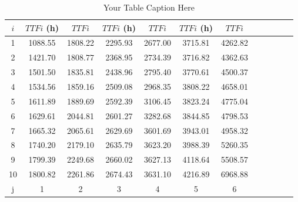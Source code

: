 \documentclass{article}
\begin{document}
\begin{table}[H]
    \centering
    \begin{tabular}{|*{12}{c|}}
        \hline
        $i$ & $TTFi$ (h) & $TTFi$ & $TTFi$ (h) & $TTFi$ & $TTFi$ (h) & $TTFi$ \\
        \hline
        1 & 1088.55 & 1808.22 & 2295.93 & 2677.00 & 3715.81 & 4262.82 \\
        2 & 1421.70 & 1808.77 & 2368.95 & 2734.39 & 3716.82 & 4362.63 \\
        3 & 1501.50 & 1835.81 & 2438.96 & 2795.40 & 3770.61 & 4500.37 \\
        4 & 1534.56 & 1859.16 & 2509.08 & 2968.35 & 3808.22 & 4658.01 \\
        5 & 1611.89 & 1889.69 & 2592.39 & 3106.45 & 3823.24 & 4775.04 \\
        6 & 1629.61 & 2044.81 & 2601.27 & 3282.68 & 3844.85 & 4798.53 \\
        7 & 1665.32 & 2065.61 & 2629.69 & 3601.69 & 3943.01 & 4958.32 \\
        8 & 1740.20 & 2179.10 & 2635.79 & 3623.20 & 3988.39 & 5260.35 \\
        9 & 1799.39 & 2249.68 & 2660.02 & 3627.13 & 4118.64 & 5508.57 \\
        10 & 1800.82 & 2261.86 & 2674.43 & 3631.10 & 4216.89 & 6968.88 \\
        j & 1 & 2 & 3 & 4 & 5 & 6 \\
        \hline
    \end{tabular}
    \caption{Your Table Caption Here}
    \label{table:4}
\end{table}
\end{document}
